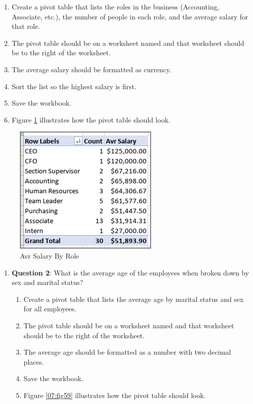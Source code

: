 \begin{enumerate}
	\begin{enumerate}
		\item Create a pivot table that lists the roles in the business (Accounting, Associate, etc.), the number of people in each role, and the average salary for that role.
		\item The pivot table should be on a worksheet named  and that worksheet should be to the right of the  worksheet.
		\item The average salary should be formatted as currency. 
		\item Sort the list so the highest salary is first. 
		\item Save the workbook.
		\item Figure \ref{07:fig58} illustrates how the pivot table should look.
	\end{enumerate}

\end{enumerate}

\begin{figure}[H]
	\centering
	\includegraphics[width=\maxwidth{.95\linewidth}]{gfx/ch07_fig58}
	\caption{Avr Salary By Role}
	\label{07:fig58}
\end{figure}

\begin{enumerate}[resume]
	\item{\textbf{Question 2}: What is the average age of the employees when broken down by sex and marital status?}
	
	\begin{enumerate}
		\item Create a pivot table that lists the average age by marital status and sex for all employees.
		\item The pivot table should be on a worksheet named  and that worksheet should be to the right of the  worksheet.
		\item The average age should be formatted as a number with two decimal places. 
		\item Save the workbook.
		\item Figure \ref{07:fig59} illustrates how the pivot table should look.
	\end{enumerate}
	
\end{enumerate}

